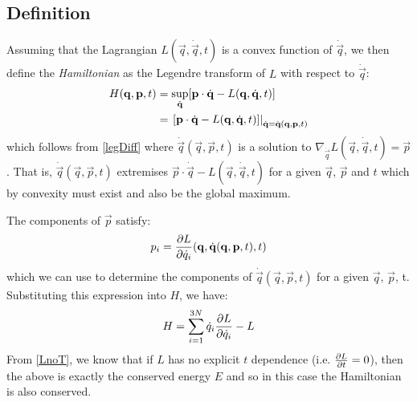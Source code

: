 \documentclass[../main.tex]{subfiles}
\begin{document}
\subsection{Definition}
\begin{definition}
  Assuming that the Lagrangian $L(\vec{q}, \dot{\vec{q}}, t)$ is a convex function of $\dot{\vec{q}}$, we then define the \textit{Hamiltonian} as the Legendre transform of $L$ with respect to $\dot{\vec{q}}$:
  \begin{align*}
    H(\mathbf{\bm{q}}, \mathbf{\bm{p}}, t) &= \sup_{\dot{\mathbf{\bm{q}}}} [\mathbf{\bm{p}} \cdot \dot{\mathbf{\bm{q}}} - L(\mathbf{\bm{q}}, \dot{\mathbf{\bm{q}}}, t)] \\
                           &= \left. [\mathbf{\bm{p}} \cdot \dot{\mathbf{\bm{q}}} - L(\mathbf{\bm{q}}, \dot{\mathbf{\bm{q}}}, t)] \right|_{\dot{\mathbf{\bm{q}}} = \dot{\mathbf{\bm{q}}}(\mathbf{\bm{q}}, \mathbf{\bm{p}}, t)}
  \end{align*}
  which follows from \cref{legDiff} where $\dot{\vec{q}}(\vec{q}, \vec{p}, t)$ is a solution to $\nabla_{\dot{\vec{q}}} L(\vec{q}, \dot{\vec{q}}, t) = \vec{p}$.
  That is, $\dot{\vec{q}}(\vec{q}, \vec{p}, t)$ extremises $\vec{p} \cdot \dot{\vec{q}} - L(\vec{q}, \dot{\vec{q}}, t)$ for a given $\vec{q}$, $\vec{p}$ and $t$ which by convexity must exist and also be the global maximum.
\end{definition}
The components of $\vec{p}$ satisfy:
\begin{equation}
  p_i = \pderiv{L}{\dot{q}_i}(\vec{q}, \dot{\vec{q}}(\vec{q}, \vec{p}, t), t) \label{pComp}
\end{equation}
which we can use to determine the components of $\dot{\vec{q}}(\vec{q}, \vec{p}, t)$ for a given $\vec{q}$, $\vec{p}$, t.
Substituting this expression into $H$, we have:
\[
  H = \sum_{i = 1}^{3N} \dot{q}_i \pderiv{L}{\dot{q}_i} - L
\]
From \cref{LnoT}, we know that if $L$ has no explicit $t$ dependence (i.e. $\pderiv{L}{t} = 0$), then the above is exactly the conserved energy $E$ and so in this case the Hamiltonian is also conserved.
\end{document}
